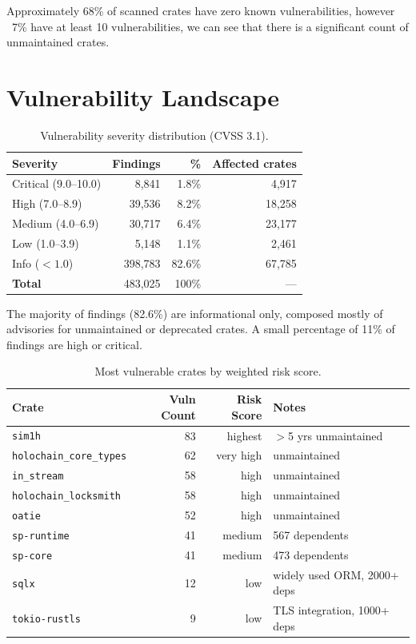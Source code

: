 Approximately 68\% of scanned crates have zero known vulnerabilities, however ~7\% have at least 10 vulnerabilities, we can see that there is a significant count of unmaintained crates.

\section{Vulnerability Landscape}\label{sect:vuln-landscape}

\begin{table}[ht]
\centering
\caption{Vulnerability severity distribution (CVSS 3.1).}\label{tab:vulnerability-severity}
\begin{tabular}{|l|r|r|r|}
\hline
\textbf{Severity} & \textbf{Findings} & \textbf{\%} & \textbf{Affected crates} \\
\hline
Critical (9.0--10.0) &   8,841 &  1.8\% &  4,917 \\
High (7.0--8.9)      &  39,536 &  8.2\% & 18,258 \\
Medium (4.0--6.9)    &  30,717 &  6.4\% & 23,177 \\
Low (1.0--3.9)       &   5,148 &  1.1\% &  2,461 \\
Info ($<1.0$)        & 398,783 & 82.6\% & 67,785 \\
\hline
\textbf{Total}       & 483,025 & 100\%  & --- \\
\hline
\end{tabular}
\end{table}

The majority of findings (82.6\%) are informational only, composed mostly of advisories for unmaintained or deprecated crates. A small percentage of 11\% of findings are high or critical. 

\begin{table}[ht]
\centering
\caption{Most vulnerable crates by weighted risk score.}\label{tab:high-risk-crates}
\begin{tabular}{|l|r|r|l|}
\hline
\textbf{Crate} & \textbf{Vuln Count} & \textbf{Risk Score} & \textbf{Notes} \\
\hline
\texttt{sim1h}                  & 83 & highest & $>$5 yrs unmaintained \\
\texttt{holochain\_core\_types} & 62 & very high & unmaintained \\
\texttt{in\_stream}             & 58 & high & unmaintained \\
\texttt{holochain\_locksmith}   & 58 & high & unmaintained \\
\texttt{oatie}                  & 52 & high & unmaintained \\
\texttt{sp-runtime}             & 41 & medium & 567 dependents \\
\texttt{sp-core}                & 41 & medium & 473 dependents \\
\texttt{sqlx}                   & 12 & low & widely used ORM, 2000+ deps \\
\texttt{tokio-rustls}           &  9 & low & TLS integration, 1000+ deps \\
\hline
\end{tabular}
\end{table}

